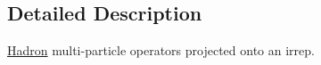 \subsection{Detailed Description}
\mbox{\hyperlink{namespaceHadron}{Hadron}} multi-\/particle operators projected onto an irrep. 

